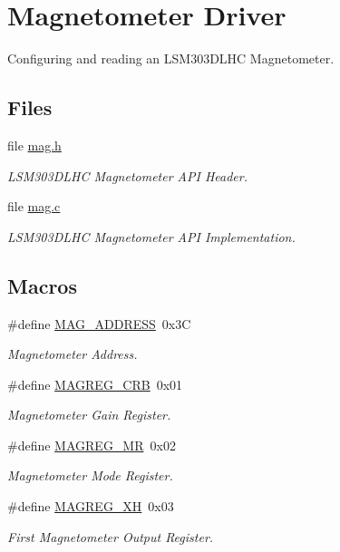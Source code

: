 \hypertarget{group__mag}{\section{Magnetometer Driver}
\label{group__mag}
}


Configuring and reading an L\-S\-M303\-D\-L\-H\-C Magnetometer.  


\subsection*{Files}
\begin{DoxyCompactItemize}
\item 
file \hyperlink{mag_8h}{mag.\-h}
\begin{DoxyCompactList}\small\item\em L\-S\-M303\-D\-L\-H\-C Magnetometer A\-P\-I Header. \end{DoxyCompactList}\item 
file \hyperlink{mag_8c}{mag.\-c}
\begin{DoxyCompactList}\small\item\em L\-S\-M303\-D\-L\-H\-C Magnetometer A\-P\-I Implementation. \end{DoxyCompactList}\end{DoxyCompactItemize}
\subsection*{Macros}
\begin{DoxyCompactItemize}
\item 
\#define \hyperlink{group__mag_gade4e63fac819c67040e374f08d2d7230}{M\-A\-G\-\_\-\-A\-D\-D\-R\-E\-S\-S}~0x3\-C
\begin{DoxyCompactList}\small\item\em Magnetometer Address. \end{DoxyCompactList}\item 
\#define \hyperlink{group__mag_ga42f59dd3e4a9cb4d8d4dd4a1019b6ab5}{M\-A\-G\-R\-E\-G\-\_\-\-C\-R\-B}~0x01
\begin{DoxyCompactList}\small\item\em Magnetometer Gain Register. \end{DoxyCompactList}\item 
\#define \hyperlink{group__mag_ga54eabf3b296f6550c9f6d9826020c623}{M\-A\-G\-R\-E\-G\-\_\-\-M\-R}~0x02
\begin{DoxyCompactList}\small\item\em Magnetometer Mode Register. \end{DoxyCompactList}\item 
\#define \hyperlink{group__mag_ga84e94fce89f9ba26ff3f33621c3a63bd}{M\-A\-G\-R\-E\-G\-\_\-\-X\-H}~0x03
\begin{DoxyCompactList}\small\item\em First Magnetometer Output Register. \end{DoxyCompactList}\end{DoxyCompactItemize}
